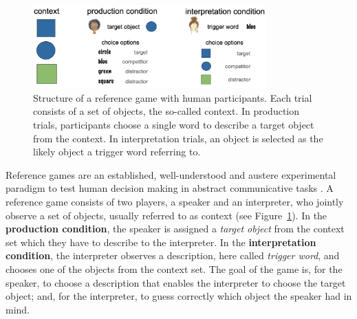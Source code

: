 \documentclass[fleqn]{article}
\begin{document}
\begin{figure}
  \centering

  \includegraphics[width = 0.8\textwidth]{00-pics/reference-game.png}

  \caption{Structure of a reference game with human participants. Each trial consists of a set of objects, the so-called context. In production trials, participants choose a single word to describe a target object from the context. In interpretation trials, an object is selected as the likely object a trigger word referring to.}
  \label{fig:ref-game}
\end{figure}

Reference games are an established, well-understood and austere experimental paradigm to test human decision making in abstract communicative tasks \citep[e.g.,][]{FrankGoodman2012:Predicting-Prag,DegenFranke2013:Cost-Based-Prag,QingFranke2013:Variations-on-a,Frank2016:Rational-speech,SikosVenhuizen2021:Reevaluating-pr}.
A reference game consists of two players, a speaker and an interpreter, who jointly observe a set of objects, usually referred to as context (see Figure~\ref{fig:ref-game}).
In the \textbf{production condition}, the speaker is assigned a \emph{target object} from the context set which they have to describe to the interpreter.
In the \textbf{interpretation condition}, the interpreter observes a description, here called \emph{trigger word}, and chooses one of the objects from the context set.
The goal of the game is, for the speaker, to choose a description that enables the interpreter to choose the target object; and, for the interpreter, to guess correctly which object the speaker had in mind.
\end{document}
